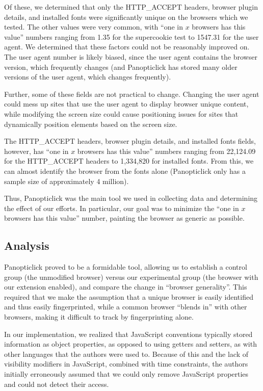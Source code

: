 \documentclass[12pt,a4paper]{article}
\begin{document}
Of these, we determined that only the HTTP\_ACCEPT headers, browser plugin details, and installed fonts were significantly unique on the browsers which we tested. The other values were very common, with ``one in $x$ browsers has this value'' numbers ranging from 1.35 for the supercookie test to 1547.31 for the user agent. We determined that these factors could not be reasonably improved on. The user agent number is likely biased, since the user agent contains the browser version, which frequently changes (and Panopticlick has stored many older versions of the user agent, which changes frequently).

Further, some of these fields are not practical to change. Changing the user agent could mess up sites that use the user agent to display browser unique content, while modifying the screen size could cause positioning issues for sites that dynamically position elements based on the screen size.

The HTTP\_ACCEPT headers, browser plugin details, and installed fonts fields, however, has ``one in $x$ browsers has this value'' numbers ranging from 22,124.09 for the HTTP\_ACCEPT headers to 1,334,820 for installed fonts. From this, we can almost identify the browser from the fonts alone (Panopticlick only has a sample size of approximately 4 million).

Thus, Panopticlick was the main tool we used in collecting data and determining the effect of our efforts. In particular, our goal was to minimize the ``one in $x$ browsers has this value'' number, painting the browser as generic as possible.

\subsection{Analysis}
Panopticlick proved to be a formidable tool, allowing us to establish a control group (the unmodified browser) versus our experimental group (the browser with our extension enabled), and compare the change in ``browser generality''. This required that we make the assumption that a unique browser is easily identified and thus easily fingerprinted, while a common browser ``blends in'' with other browsers, making it difficult to track by fingerprinting alone.

In our implementation, we realized that JavaScript conventions typically stored information as object properties, as opposed to using getters and setters, as with other languages that the authors were used to. Because of this and the lack of visibility modifiers in JavaScript, combined with time constraints, the authors initially erroneously assumed that we could only remove JavaScript properties and could not detect their access.
\end{document}
